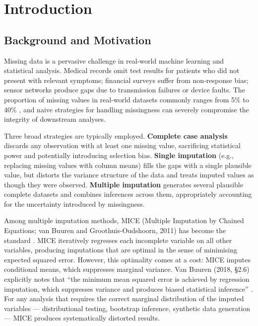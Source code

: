 
\chapter{Introduction}
\label{Chapter1}


\section{Background and Motivation}

Missing data is a pervasive challenge in real-world machine learning and statistical analysis. Medical records omit test results for patients who did not present with relevant symptoms; financial surveys suffer from non-response bias; sensor networks produce gaps due to transmission failures or device faults. The proportion of missing values in real-world datasets commonly ranges from 5\% to 40\% \cite{vanBuuren2018}, and naive strategies for handling missingness can severely compromise the integrity of downstream analyses.

Three broad strategies are typically employed. \textbf{Complete case analysis} discards any observation with at least one missing value, sacrificing statistical power and potentially introducing selection bias. \textbf{Single imputation} (e.g., replacing missing values with column means) fills the gaps with a single plausible value, but distorts the variance structure of the data and treats imputed values as though they were observed. \textbf{Multiple imputation} generates several plausible complete datasets and combines inferences across them, appropriately accounting for the uncertainty introduced by missingness.

Among multiple imputation methods, MICE (Multiple Imputation by Chained Equations; van Buuren and Groothuis-Oudshoorn, 2011) has become the standard \cite{vanBuuren2011}. MICE iteratively regresses each incomplete variable on all other variables, producing imputations that are optimal in the sense of minimising expected squared error. However, this optimality comes at a cost: MICE imputes conditional means, which suppresses marginal variance. Van Buuren (2018, \S2.6) explicitly notes that ``the minimum mean squared error is achieved by regression imputation, which suppresses variance and produces biased statistical inference'' \cite{vanBuuren2018}. For any analysis that requires the correct marginal distribution of the imputed variables --- distributional testing, bootstrap inference, synthetic data generation --- MICE produces systematically distorted results.

